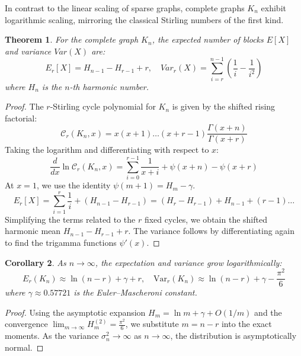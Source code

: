 \documentclass{amsart}
\newtheorem{theorem}{Theorem}[section]
\newtheorem{corollary}[theorem]{Corollary}
\theoremstyle{definition}
\begin{document}


In contrast to the linear scaling of sparse graphs, complete graphs $K_n$ exhibit logarithmic scaling, mirroring the classical Stirling numbers of the first kind.

\begin{theorem}
For the complete graph $K_n$, the expected number of blocks $E[X]$ and variance $Var(X)$ are:
\begin{equation}
    E_r[X] = H_{n-1} - H_{r-1} + r, \quad Var_r(X) = \sum_{i=r}^{n-1} \left( \frac{1}{i} - \frac{1}{i^2} \right)
\end{equation}
where $H_n$ is the $n$-th harmonic number.
\end{theorem}
\begin{proof}
The $r$-Stirling cycle polynomial for $K_n$ is given by the shifted rising factorial:
\[ \mathcal{C}_r(K_n, x) = x(x+1)\dots(x+r-1) \frac{\Gamma(x+n)}{\Gamma(x+r)} \]
Taking the logarithm and differentiating with respect to $x$:
\[ \frac{d}{dx} \ln \mathcal{C}_r(K_n, x) = \sum_{i=0}^{r-1} \frac{1}{x+i} + \psi(x+n) - \psi(x+r) \]
At $x=1$, we use the identity $\psi(m+1) = H_m - \gamma$.
\[ E_r[X] = \sum_{i=1}^{r} \frac{1}{i} + (H_{n-1} - H_{r-1}) = (H_r - H_{r-1}) + H_{n-1} + (r-1) \dots \]
Simplifying the terms related to the $r$ fixed cycles, we obtain the shifted harmonic mean $H_{n-1} - H_{r-1} + r$. The variance follows by differentiating again to find the trigamma functions $\psi'(x)$.
\end{proof}



\begin{corollary}
As $n \to \infty$, the expectation and variance grow logarithmically:
\begin{equation*}
    E_r(K_n) \approx \ln(n-r) + \gamma + r, \quad \text{Var}_r(K_n) \approx \ln(n-r) + \gamma - \frac{\pi^2}{6}
\end{equation*}
where $\gamma \approx 0.57721$ is the Euler--Mascheroni constant.
\end{corollary}
\begin{proof}
Using the asymptotic expansion $H_m = \ln m + \gamma + O(1/m)$ and the convergence $\lim_{m \to \infty} H_m^{(2)} = \frac{\pi^2}{6}$, we substitute $m = n-r$ into the exact moments. As the variance $\sigma_n^2 \to \infty$ as $n \to \infty$, the distribution is asymptotically normal.
\end{proof}
\end{document}
